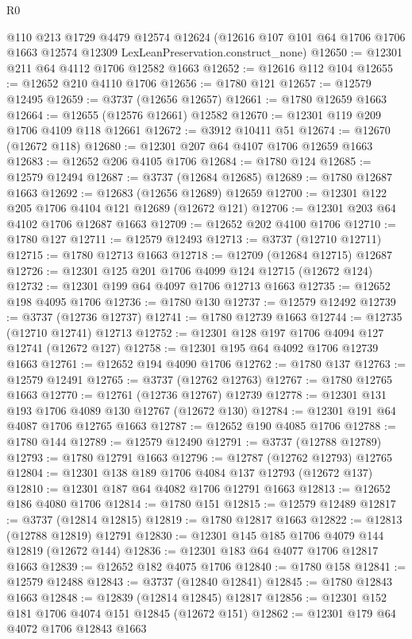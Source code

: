 \begin{lexlean}{R0}
\begin{coremodule}
    @110
    @213
    @1729
    @4479
    @12574
    @12624
    (@12616 @107 @101 @64 @1706 @1706 @1663 @12574 @12309 LexLeanPreservation.construct_none)
@12650 := @12301 @211 @64 @4112 @1706 @12582 @1663
@12652 := @12616 @112 @104
@12655 := @12652 @210 @4110 @1706
@12656 := @1780 @121
@12657 := @12579 @12495
@12659 := @3737 (@12656 @12657)
@12661 := @1780 @12659 @1663
@12664 := @12655 (@12576 @12661) @12582
@12670 := @12301 @119 @209 @1706 @4109 @118 @12661
@12672 := @3912 @10411 @51
@12674 := @12670 (@12672 @118)
@12680 := @12301 @207 @64 @4107 @1706 @12659 @1663
@12683 := @12652 @206 @4105 @1706
@12684 := @1780 @124
@12685 := @12579 @12494
@12687 := @3737 (@12684 @12685)
@12689 := @1780 @12687 @1663
@12692 := @12683 (@12656 @12689) @12659
@12700 := @12301 @122 @205 @1706 @4104 @121 @12689 (@12672 @121)
@12706 := @12301 @203 @64 @4102 @1706 @12687 @1663
@12709 := @12652 @202 @4100 @1706
@12710 := @1780 @127
@12711 := @12579 @12493
@12713 := @3737 (@12710 @12711)
@12715 := @1780 @12713 @1663
@12718 := @12709 (@12684 @12715) @12687
@12726 := @12301 @125 @201 @1706 @4099 @124 @12715 (@12672 @124)
@12732 := @12301 @199 @64 @4097 @1706 @12713 @1663
@12735 := @12652 @198 @4095 @1706
@12736 := @1780 @130
@12737 := @12579 @12492
@12739 := @3737 (@12736 @12737)
@12741 := @1780 @12739 @1663
@12744 := @12735 (@12710 @12741) @12713
@12752 := @12301 @128 @197 @1706 @4094 @127 @12741 (@12672 @127)
@12758 := @12301 @195 @64 @4092 @1706 @12739 @1663
@12761 := @12652 @194 @4090 @1706
@12762 := @1780 @137
@12763 := @12579 @12491
@12765 := @3737 (@12762 @12763)
@12767 := @1780 @12765 @1663
@12770 := @12761 (@12736 @12767) @12739
@12778 := @12301 @131 @193 @1706 @4089 @130 @12767 (@12672 @130)
@12784 := @12301 @191 @64 @4087 @1706 @12765 @1663
@12787 := @12652 @190 @4085 @1706
@12788 := @1780 @144
@12789 := @12579 @12490
@12791 := @3737 (@12788 @12789)
@12793 := @1780 @12791 @1663
@12796 := @12787 (@12762 @12793) @12765
@12804 := @12301 @138 @189 @1706 @4084 @137 @12793 (@12672 @137)
@12810 := @12301 @187 @64 @4082 @1706 @12791 @1663
@12813 := @12652 @186 @4080 @1706
@12814 := @1780 @151
@12815 := @12579 @12489
@12817 := @3737 (@12814 @12815)
@12819 := @1780 @12817 @1663
@12822 := @12813 (@12788 @12819) @12791
@12830 := @12301 @145 @185 @1706 @4079 @144 @12819 (@12672 @144)
@12836 := @12301 @183 @64 @4077 @1706 @12817 @1663
@12839 := @12652 @182 @4075 @1706
@12840 := @1780 @158
@12841 := @12579 @12488
@12843 := @3737 (@12840 @12841)
@12845 := @1780 @12843 @1663
@12848 := @12839 (@12814 @12845) @12817
@12856 := @12301 @152 @181 @1706 @4074 @151 @12845 (@12672 @151)
@12862 := @12301 @179 @64 @4072 @1706 @12843 @1663

\end{coremodule}
\end{lexlean}
